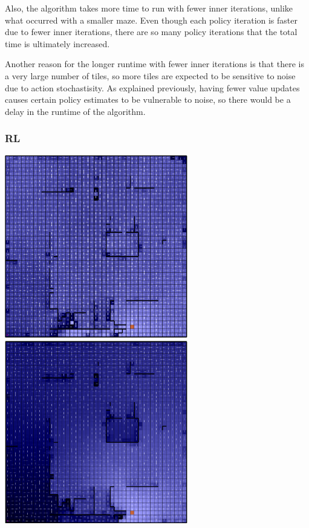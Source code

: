 \documentclass[11pt]{article}
\begin{document}
            Also, the algorithm takes more time to run with fewer inner iterations, unlike what
            occurred with a smaller maze. Even though each policy iteration is faster due to
            fewer inner iterations, there are so many policy iterations that the total time
            is ultimately increased.
            
            Another reason for the longer runtime with fewer inner iterations is that there is a very large number of
            tiles, so more tiles are expected to be sensitive to noise due to action
            stochastisity. As explained previously,
            having fewer value updates causes certain policy estimates to be vulnerable to noise,
            so there would be a delay in the runtime of the algorithm.

            \subsubsection{RL}

            \includegraphics[width=8cm]{../images/large/q_20.PNG}
            \includegraphics[width=8cm]{../images/large/q.PNG}
\end{document}
